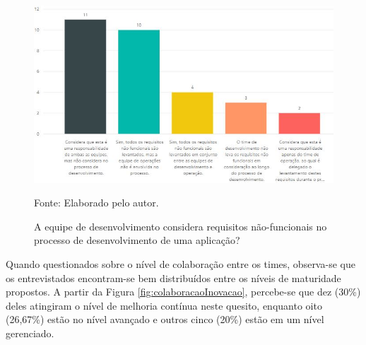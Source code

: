 \documentclass[twoside,english,brazilian]{UNISINOSartigo}
\newcommand{\source}[1]{\caption*{Fonte: {#1}} }
\begin{document}
\begin{figure}[H]
    \centering
    \caption{A equipe de desenvolvimento considera requisitos não-funcionais no processo de desenvolvimento de uma aplicação?}
       \includegraphics[scale=.6]{imagens/requisitos.JPG}
        \source{Elaborado pelo autor.}
    \label{fig:requisitos}
\end{figure}

Quando questionados sobre o nível de colaboração entre os times, observa-se que os entrevistados encontram-se bem distribuídos entre os níveis de maturidade propostos. A partir da Figura \ref{fig:colaboracaoInovacao}, percebe-se que dez (30\%) deles atingiram o nível de melhoria contínua neste quesito, enquanto oito (26,67\%) estão no nível avançado e outros cinco (20\%) estão em um nível gerenciado. 
\end{document}

